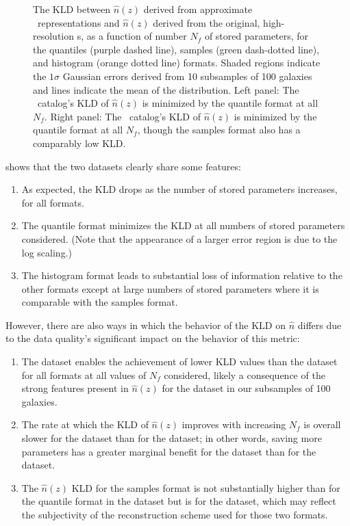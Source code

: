 \begin{figure}
\begin{center}
		\caption{The KLD between $\hat{n}(z)$ derived from approximate \pz\ 
			representations and $\hat{n}(z)$ derived from the original, high-resolution \pz 
			s, as a function of number $N_{f}$ of stored parameters, for the quantiles 
			(purple dashed line), samples (green dash-dotted line), and histogram (orange 
			dotted line) formats.
			Shaded regions indicate the $1\sigma$ Gaussian errors derived from 10 
			subsamples of 100 galaxies and lines indicate the mean of the distribution.
			Left panel: The \mgdata \pz\ catalog's KLD of $\hat{n}(z)$ is minimized by 
			the quantile format at all $N_{f}$.
			Right panel: The \ssdata \pz\ catalog's KLD of $\hat{n}(z)$ is minimized by 
			the quantile format at all $N_{f}$, though the samples format also has a 
			comparably low KLD.
			}
	\end{center}
\end{figure}
 shows that the two datasets clearly share some features:
\begin{enumerate}
	\item As expected, the KLD drops as the number of stored parameters increases, 
	for all formats.
	\item The quantile format minimizes the KLD at all numbers of stored parameters 
	considered.  (Note that the appearance of a larger error region is due to the 
	log scaling.)
	\item The histogram format leads to substantial loss of information relative to 
	the other formats except at large numbers of stored parameters where it is 
	comparable with the samples format.
\end{enumerate}
However, there are also ways in which the behavior of the KLD on $\hat{n}$ 
differs due to the data quality's significant impact on the behavior of this 
metric:
\begin{enumerate}
	\item The \ssdata dataset enables the achievement of lower KLD values than the 
	\mgdata dataset for all formats at all values of $N_{f}$ considered, likely a 
	consequence of the strong features present in $\hat{n}(z)$ for the \mgdata 
	dataset in our subsamples of 100 galaxies.
	\item The rate at which the KLD of $\hat{n}(z)$ improves with increasing $N_{f} 
	$ is overall slower for the \mgdata dataset than for the \ssdata dataset; in 
	other words, saving more parameters has a greater marginal benefit for the 
	\ssdata dataset than for the \mgdata dataset.
	\item The $\hat{n}(z)$ KLD for the samples format is not substantially higher 
	than for the quantile format in the \ssdata dataset but is for the \mgdata 
	dataset, which may reflect the subjectivity of the reconstruction scheme used 
	for those two formats.
\end{enumerate}

